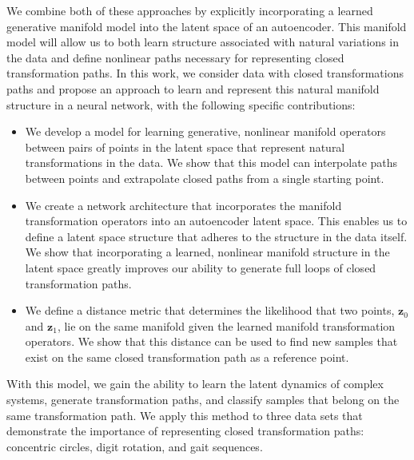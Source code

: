 \documentclass[letterpaper]{article} %
\newcommand{\vtr}[1]{\ensuremath{\mathbf{#1}}}
\begin{document}
We combine both of these approaches by explicitly incorporating a learned generative manifold model into the latent space of an autoencoder. This manifold model will allow us to both learn structure associated with natural variations in the data and define nonlinear paths necessary for representing closed transformation paths. In this work, we consider data with closed transformations paths and propose an approach to learn and represent this natural manifold structure in a neural network, with the following specific contributions:
\begin{itemize}
\item We develop a model for learning generative, nonlinear manifold operators between pairs of points in the latent space that represent natural transformations in the data. We show that this model can interpolate paths between points and extrapolate closed paths from a single starting point.
\item We create a network architecture that incorporates the manifold transformation operators into an autoencoder latent space. This enables us to define a latent space structure that adheres to the structure in the data itself. We show that incorporating a learned, nonlinear manifold structure in the latent space greatly improves our ability to generate full loops of closed transformation paths.
\item We define a distance metric that determines the likelihood that two points, $\vtr{z}_0$ and $\vtr{z}_1$, lie on the same manifold given the learned manifold transformation operators. We show that this distance can be used to find new samples that exist on the same closed transformation path as a reference point.\end{itemize}

With this model, we gain the ability to learn the latent dynamics of complex systems, generate transformation paths, and classify samples that belong on the same transformation path. We apply this method to three data sets that demonstrate the importance of representing closed transformation paths: concentric circles, digit rotation, and gait sequences.
\end{document}
